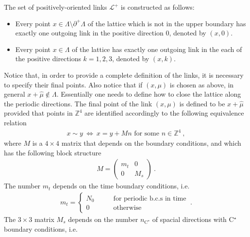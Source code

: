 \documentclass[11pt,fleqn]{article}
\begin{document}
The set of positively-oriented links $\mathcal{L}^+$ is constructed as follows:
\begin{itemize}[nolistsep,noitemsep]
   \item Every point $x \in \Lambda \setminus \partial^+ \Lambda$ of the lattice which is not in the upper boundary has exactly one outgoing link in the positive direction $0$, denoted by $(x,0)$.
   \item Every point $x \in \Lambda$ of the lattice has exactly one outgoing link in the each of the positive directions $k=1,2,3$, denoted by $(x,k)$.
\end{itemize}
Notice that, in order to provide a complete definition of the links, it is necessary to specify their final points. Also notice that if $(x,\mu)$ is chosen as above, in general $x + \hat{\mu} \not\in \Lambda$. Essentially one needs to define how to close the lattice along the periodic directions. The final point of the link $(x,\mu)$ is defined to be $x + \hat{\mu}$ provided that points in $\mathbb{Z}^4$ are identified accordingly to the following equivalence relation
\begin{gather}
   x \sim y \ \Longleftrightarrow \ 
   x = y + M n \text{ for some } n \in \mathbb{Z}^4 \ ,
   \label{eq:identification}
\end{gather}
where $M$ is a $4 \times 4$ matrix that depends on the boundary conditions, and which has the following block structure
\begin{gather}
   M =
   \begin{pmatrix}
      m_t & 0 \\
      0 & M_s
   \end{pmatrix}
   \ .
\end{gather}
The number $m_t$ depends on the time boundary conditions, i.e.
\begin{gather}
   m_t =
   \begin{cases}
      N_0 \qquad & \text{for periodic b.c.s in time} \\
      0 \qquad & \text{otherwise}
   \end{cases}
   \ .
\end{gather}
The $3 \times 3$ matrix $M_s$ depends on the number $n_{\text{C}^\star}$ of spacial directions with C$^\star$ boundary conditions, i.e.
\end{document}
